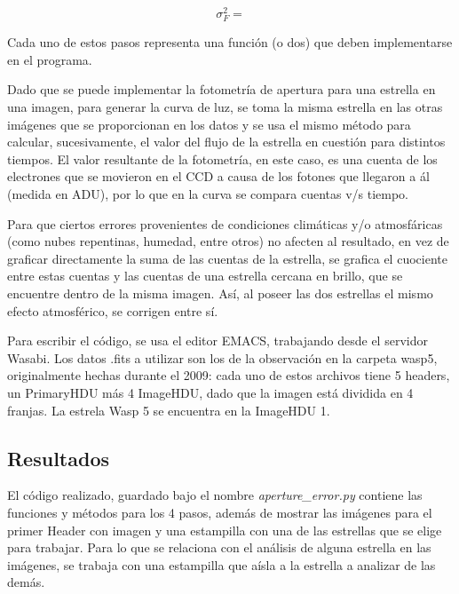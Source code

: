 \documentclass[a4paper, 11pt, spanish]{article}
\begin{document}
\begin{itemize}
	\begin{equation*}
	\sigma_F^2 = 
	\end{equation*}
	
\end{itemize}

Cada uno de estos pasos representa una funci\'on (o dos) que deben implementarse en el programa.

Dado que se puede implementar la fotometr\'ia de apertura para una estrella en una imagen, para generar la curva de luz, se toma la misma estrella en las otras im\'agenes que se proporcionan en los datos y se usa el mismo m\'etodo para calcular, sucesivamente, el valor del flujo de la estrella en cuesti\'on para distintos tiempos. El valor resultante de la fotometr\'ia, en este caso, es una cuenta de los electrones que se movieron en el CCD a causa de los fotones que llegaron a \'al (medida en ADU), por lo que en la curva se compara cuentas v/s tiempo. 

Para que ciertos errores provenientes de condiciones clim\'aticas y/o atmosf\'aricas (como nubes repentinas, humedad, entre otros) no afecten al resultado, en vez de graficar directamente la suma de las cuentas de la estrella, se grafica el cuociente entre estas cuentas y las cuentas de una estrella cercana en brillo, que se encuentre dentro de la misma imagen. As\'i, al poseer las dos estrellas el mismo efecto atmosf\'erico, se corrigen entre s\'i.

Para escribir el c\'odigo, se usa el editor EMACS, trabajando desde el servidor Wasabi. Los datos .fits a utilizar son los de la observaci\'on en la carpeta wasp5, originalmente hechas durante el 2009: cada uno de estos archivos tiene 5 headers, un PrimaryHDU m\'as 4 ImageHDU, dado que la imagen est\'a dividida en 4 franjas. La estrela Wasp 5 se encuentra en la ImageHDU 1. 


\subsection{Resultados}

El c\'odigo realizado, guardado bajo el nombre  \textit{aperture\_error.py} contiene las funciones y m\'etodos para los 4 pasos, adem\'as de mostrar las im\'agenes para el primer Header con imagen y una estampilla con una de las estrellas que se elige para trabajar. Para lo que se relaciona con el an\'alisis de alguna estrella en las im\'agenes, se trabaja con una estampilla que a\'isla a la estrella a analizar de las dem\'as.
\end{document}
